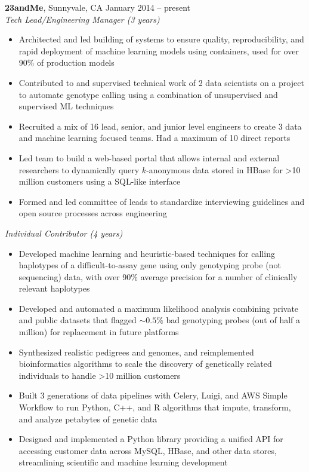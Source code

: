 \documentclass[margin,line]{resume}
\begin{document}
\begin{resume}
    \textbf{23andMe}, Sunnyvale, CA \hfill\hfill January 2014 -- present\\%
    \textsl{Tech Lead/Engineering Manager (3 years)}
    \begin{itemize}
    \item Architected and led building of systems to ensure quality, reproducibility, and rapid deployment of machine learning models using containers, used for over 90\% of production models
    \item Contributed to and supervised technical work of 2 data scientists on a project to automate genotype calling using a combination of unsupervised and supervised ML techniques
    \item Recruited a mix of 16 lead, senior, and junior level engineers to create 3 data and machine learning focused teams. Had a maximum of 10 direct reports
    \item Led team to build a web-based portal that allows internal and external researchers to dynamically query \(k\)-anonymous data stored in HBase for \textgreater 10 million customers using a SQL-like interface
    \item Formed and led committee of leads to standardize interviewing guidelines and open source processes across engineering
    \end{itemize}
    \textsl{Individual Contributor (4 years)}
    \begin{itemize}
    \item Developed machine learning and heuristic-based techniques for calling haplotypes of a difficult-to-assay gene using only genotyping probe (not sequencing) data, with over 90\% average precision for a number of clinically relevant haplotypes
     \item Developed and automated a maximum likelihood analysis combining private and public datasets that flagged \(\sim0.5\%\) bad genotyping probes (out of half a million) for replacement in future platforms
     \item Synthesized realistic pedigrees and genomes, and reimplemented bioinformatics algorithms to scale the discovery of genetically related individuals to handle \textgreater10 million customers
     \item Built 3 generations of data pipelines with Celery, Luigi, and AWS Simple Workflow to run Python, C++, and R algorithms that impute, transform, and analyze petabytes of genetic data
    \item Designed and implemented a Python library providing a unified API for accessing customer data across MySQL, HBase, and other data stores, streamlining scientific and machine learning development

\end{itemize}
\end{resume}
\end{document}
